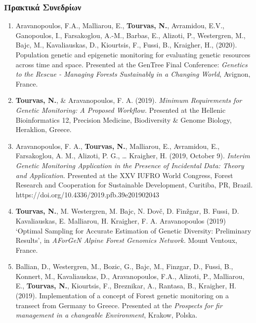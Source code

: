 \documentclass[12pt,]{scrartcl}
\begin{document}
\subsubsection{Πρακτικά Συνεδρίων}\label{conferences}

\vspace{-3mm}
\begin{enumerate}
\leftskip-0.13in
	\setcounter{enumi}{1}
	
\leftskip-0.07in  

\leftskip-0.07in  

\item Aravanopoulos, F.A., Malliarou, E., \textbf{Tourvas, N.}, Avramidou, E.V., Ganopoulos, I., Farsakoglou, A.-M., Barbas, E., Alizoti, P., Westergren, M., Bajc, M., Kavaliauskas, D., Kiourtsis, F., Fussi, B., Kraigher, H., (2020). Population genetic and epigenetic monitoring for evaluating genetic resources across time and space. Presented at the GenTree Final Conference: \textit{Genetics to the Rescue - Managing Forests Sustainably in a Changing World}, Avignon, France.

\item \textbf{Tourvas, N.}, & Aravanopoulos, F. A. (2019). \textit{Minimum Requirements for Genetic Monitoring: A Proposed Workflow.} Presented at the Hellenic Bioinformatics 12, Precision Medicine, Biodiversity \& Genome Biology, Heraklion, Greece.

\item Aravanopoulos, F. A., \textbf{Tourvas, N.}, Malliarou, E., Avramidou, E., Farsakoglou, A. M., Alizoti, P. G., … Kraigher, H. (2019, October 9). \textit{Interim Genetic Monitoring Application in the Presence of Incidental Data: Theory and Application}. Presented at the XXV IUFRO World Congress, Forest Research and Cooperation for Sustainable Development, Curitiba, PR, Brazil. https://doi.org/10.4336/2019.pfb.39e201902043

\item {\textbf{Tourvas, N.}, M. Westergren, M. Bajc, N. Dovč, D. Finžgar, B. Fussi, D. Kavaliauskas, E. Malliarou, H. Kraigher, F. A. Aravanopoulos (2019) ‘Optimal Sampling for Accurate Estimation of Genetic Diversity: Preliminary Results’, in \textit{AForGeN Alpine Forest Genomics Network.} Mount Ventoux, France.}

\item {Ballian, D., Westergren, M., Bozic, G., Bajc, M., Finzgar, D., Fussi, B., Konnert, M., Kavaliauskas, D., Aravanopoulos, F.A., Alizoti, P., Malliarou, E., \textbf{Tourvas, N.}, Kiourtsis, F., Breznikar, A., Rantasa, B., Kraigher, H. (2019). Implementation of a concept of Forest genetic monitoring on a transect from Germany to Greece. Presented at the \textit{Prospects for fir management in a changeable Environment}, Krakow, Polska. }


\end{enumerate}
\end{document}
